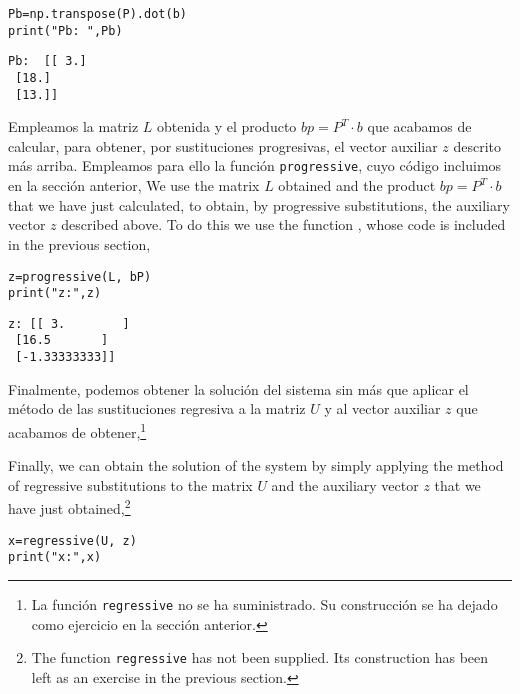 \begin{verbatim}
Pb=np.transpose(P).dot(b)
print("Pb: ",Pb)
\end{verbatim}

\begin{verbatim}
Pb:  [[ 3.]
 [18.]
 [13.]]  
\end{verbatim}

\begin{paracol}{2}

Empleamos la matriz $L$ obtenida y el producto $bp=P^T\cdot b$ que acabamos de calcular, para obtener, por sustituciones progresivas, el vector auxiliar $z$ descrito más arriba. Empleamos para ello la función \texttt{progressive}, cuyo código incluimos en la sección anterior, 
\switchcolumn
We use the matrix $L$ obtained and the product $bp=P^T\cdot b$ that we have just calculated, to obtain, by progressive substitutions, the auxiliary vector $z$ described above. To do this we use the function , whose code is included in the previous section, 
\end{paracol}

\begin{verbatim}
z=progressive(L, bP)
print("z:",z)    
\end{verbatim}

\begin{verbatim}
z: [[ 3.        ]
 [16.5       ]
 [-1.33333333]]  
\end{verbatim}

\begin{paracol}{2}

Finalmente, podemos obtener la solución del sistema sin más que aplicar el método de las sustituciones regresiva a la matriz $U$ y al vector auxiliar $z$ que acabamos de obtener,\footnote{La función \texttt{regressive} no se ha suministrado. Su construcción se ha dejado como ejercicio en la sección anterior.}

\switchcolumn
Finally, we can obtain the solution of the system by simply applying the method of regressive substitutions to the matrix $U$ and the auxiliary vector $z$ that we have just obtained,\footnote{ The function \texttt{regressive} has not been supplied. Its construction has been left as an exercise in the previous section.}
\end{paracol}

\begin{verbatim}
x=regressive(U, z)
print("x:",x)
\end{verbatim}

